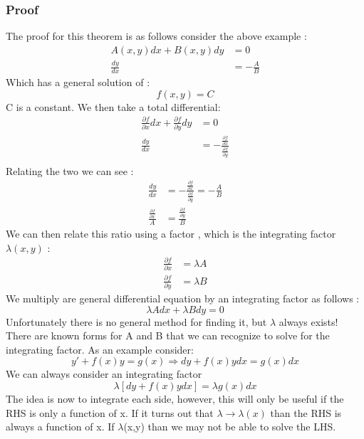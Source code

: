 \documentclass{article}
\newcommand{\be}{\begin{equation}}
\newcommand{\ee}{\end{equation}}
\begin{document}
\subsubsection*{Proof}
The proof for this theorem is as follows consider the above example :
\be
\begin{split}
A(x,y)dx + B(x,y)dy &= 0 \\
\frac{dy}{dx} &= -\frac{A}{B}
\end{split}
\ee
Which has a general solution of :
\be
f(x,y) = C
\ee
C is a constant. We then take a total differential:
\be
\begin{split}
\frac{\partial f}{\partial x}dx + \frac{\partial f}{\partial y} dy &= 0 \\
\frac{dy}{dx} &=  - \frac{\frac{\partial f}{\partial x}}{\frac{\partial f}{\partial y}}\\
\end{split}
\ee
Relating the two we can see :
\be
\begin{split}
   \frac{dy}{dx} &=  - \frac{\frac{\partial f}{\partial x}}{\frac{\partial f}{\partial y}}= -\frac{A}{B}\\
   \frac{\frac{\partial f}{\partial x}}{A} &= \frac{\frac{\partial f}{\partial y}}{B}
\end{split}
\ee
We can then relate this ratio using a factor , which is the integrating factor $\lambda(x,y)$ :
\be
\begin{split}
\frac{\partial f}{\partial x} &= \lambda A  \\
\frac{\partial f}{\partial y} &= \lambda B
\end{split}
\ee
We multiply are general differential equation by an integrating factor as follows :
\be
\lambda A dx + \lambda B dy = 0
\ee
Unfortunately there is no general method for finding it, but $\lambda$ always exists!
There are known forms for A and B that we can recognize to solve for the integrating factor. As an example consider:
\be
y' + f(x) y = g(x) \Rightarrow dy + f(x) y dx = g(x) dx
\ee
We can always consider an integrating factor
\be
\lambda \left[dy + f(x) y dx\right] = \lambda g(x) dx
\ee
The idea is now to integrate each side, however, this will only be useful if the RHS is only a function of x.
If it turns out that $\lambda \rightarrow \lambda(x)$ than the RHS is always a function of x.
If $\lambda$(x,y) than we may not be able to solve the LHS.
\end{document}
